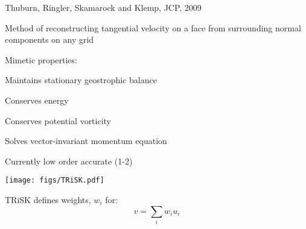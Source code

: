 \begin{slide}

Thuburn, Ringler, Skamarock and Klemp, JCP, 2009

\begin{list0}
\item Method of reconstructing tangential velocity on a face from surrounding normal components on any grid
\item Mimetic properties:
    \begin{list1}
    \item Maintains stationary geostrophic balance
    \item Conserves energy
    \item Conserves potential vorticity
    \end{list1}
\item Solves vector-invariant momentum equation
\item Currently low order accurate (1-2)
\end{list0}

\begin{minipage}{0.4\linewidth}
\texttt{[image: figs/TRiSK.pdf]}
\end{minipage}
\begin{minipage}{0.49\linewidth}\centering
TRiSK defines weights, $w_i$ for:
\[v = \sum_i w_i u_i\]
\end{minipage}
\end{slide}

